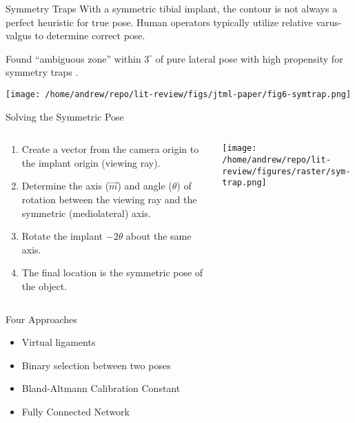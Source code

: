 \documentclass[presentation, aspectratio=1610]{beamer}
\begin{document}
\begin{frame}[label={sec:org2a317e8}]{Symmetry Traps}
With a symmetric tibial implant, the contour is not always a perfect heuristic for true pose. Human operators typically utilize relative varus-valgus to determine correct pose.

Found ``ambiguous zone'' within \(3^{\circ}\) of pure lateral pose with high propensity for symmetry traps \autocite{jensenJointTrackMachine2022}.

\begin{center}
\texttt{[image: /home/andrew/repo/lit-review/figs/jtml-paper/fig6-symtrap.png]}
\end{center}
\end{frame}
\begin{frame}[label={sec:org0d5cba5}]{Solving the Symmetric Pose}
\begin{columns}
\begin{column}{0.5\columnwidth}
\begin{enumerate}
\item Create a vector from the camera origin to the implant origin (viewing ray).
\item Determine the axis (\(\vec{m}\)) and angle (\(\theta\)) of rotation between the viewing ray and the symmetric (mediolateral) axis.
\item Rotate the implant \(-2\theta\) about the same axis.
\item The final location is the symmetric pose of the object.
\end{enumerate}
\end{column}
\begin{column}{0.6\columnwidth}
\begin{center}
\texttt{[image: /home/andrew/repo/lit-review/figures/raster/sym-trap.png]}
\end{center}
\end{column}
\end{columns}
\end{frame}
\begin{frame}[label={sec:orgb02457c}]{Four Approaches}
\begin{itemize}
\item Virtual ligaments
\item Binary selection between two poses
\item Bland-Altmann Calibration Constant
\item Fully Connected Network
\end{itemize}
\end{frame}
\end{document}

